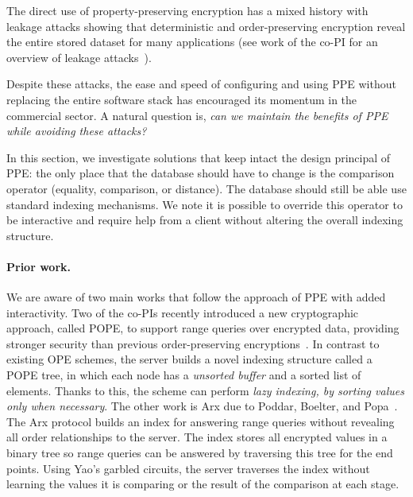 
The direct use of property-preserving encryption has a mixed history
with leakage attacks showing that deterministic and order-preserving
encryption reveal the entire stored dataset for many applications (see
work of the co-PI for an overview of leakage
attacks~\cite{SP:FVYSHG17}).

Despite these attacks, the ease and speed of configuring and using PPE
without replacing the entire software stack has encouraged its momentum
in the commercial sector. A natural question is, \emph{can we maintain
the benefits of PPE while avoiding these attacks?}

In this section, we investigate solutions that keep intact
the design principal of PPE: the only place that the database should
have to change is the comparison operator (equality, comparison, or
distance).  The database should still be able use standard indexing
mechanisms.  We note it is possible to override this operator to be
interactive and require help from a client without altering the overall
indexing structure.

\paragraph{Prior work.}
We are aware of two main works that follow the approach of PPE with added
interactivity.  Two of the co-PIs recently introduced a new cryptographic
approach, called POPE, to support range queries over encrypted data, providing
stronger security than previous order-preserving encryptions~\cite{CCS:RACY16}.
In contrast to existing OPE schemes, the server builds a novel indexing
structure called a POPE tree, in which each node has a {\it unsorted buffer}
and a sorted list of elements.  Thanks to this, the scheme can perform {\it
lazy indexing, by sorting values only when necessary}. 
%
The other work is Arx due to Poddar, Boelter, and
Popa~\cite{EPRINT:PodBoePop16}.  The Arx protocol builds an index for answering
range queries without revealing all order relationships to the server. The
index stores all encrypted values in a binary tree so range queries can be
answered by traversing this tree for the end points. Using Yao's garbled
circuits, the server traverses the index without learning the values it is
comparing or the result of the comparison at each stage.  

